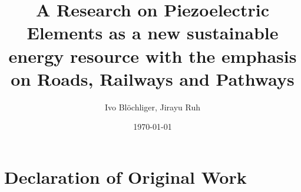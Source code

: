 \documentclass[a4paper,11pt]{report}
\title                   %
{A Research on Piezoelectric Elements as a new sustainable energy resource with the emphasis on Roads, Railways and Pathways}
\date{\today}   %
\author{Ivo Blöchliger, Jirayu Ruh}  %
\begin{document}


\tableofcontents %
\newpage %



\onehalfspacing %
\renewcommand{\chaptermark}[1]{\markboth{\MakeUppercase{\thechapter.\ #1}}{}} %
\renewcommand{\sectionmark}[1]{\markright{\thesection.\ #1}{}} %
\fancyhead[R]{\rightmark}
\fancyhead[L]{\leftmark}
\fancyhead[C]{\thepage{}} %
\fancyhead[L]{\leftmark}
\fancyhead[R]{\rightmark}
\fancyfoot{}
\pagestyle{fancy}





\cleardoublepage  %
\printindex %


\cleardoublepage %
\listoffigures %

\cleardoublepage %
\lstlistoflistings %

\cleardoublepage %
\printbibliography %



\appendix

\chapter{Declaration of Original Work}\label{ch:appendix_independencedeclaration}





\end{document}
